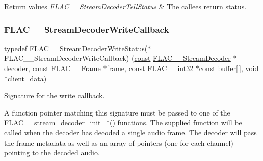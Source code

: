 \begin{DoxyRetVals}{Return values}
{\em F\+L\+A\+C\+\_\+\+\_\+\+Stream\+Decoder\+Tell\+Status} & The callee\textquotesingle{}s return status. \\
\hline
\end{DoxyRetVals}
\mbox{\label{group__flac__stream__decoder_ga61e48dc2c0d2f6c5519290ff046874a4}} 
\subsubsection{\texorpdfstring{F\+L\+A\+C\+\_\+\+\_\+\+Stream\+Decoder\+Write\+Callback}{FLAC\_\_StreamDecoderWriteCallback}}
{\footnotesize\ttfamily typedef \hyperlink{group__flac__stream__decoder_ga73f67eb9e0ab57945afe038751bc62c8}{F\+L\+A\+C\+\_\+\+\_\+\+Stream\+Decoder\+Write\+Status}($\ast$ F\+L\+A\+C\+\_\+\+\_\+\+Stream\+Decoder\+Write\+Callback) (\hyperlink{zconf_8h_a2c212835823e3c54a8ab6d95c652660e}{const} \hyperlink{struct_f_l_a_c_____stream_decoder}{F\+L\+A\+C\+\_\+\+\_\+\+Stream\+Decoder} $\ast$decoder, \hyperlink{zconf_8h_a2c212835823e3c54a8ab6d95c652660e}{const} \hyperlink{struct_f_l_a_c_____frame}{F\+L\+A\+C\+\_\+\+\_\+\+Frame} $\ast$frame, \hyperlink{zconf_8h_a2c212835823e3c54a8ab6d95c652660e}{const} \hyperlink{ordinals_8h_a33fd77bfe6d685541a0c034a75deccdc}{F\+L\+A\+C\+\_\+\+\_\+int32} $\ast$\hyperlink{zconf_8h_a2c212835823e3c54a8ab6d95c652660e}{const} buffer\mbox{[}$\,$\mbox{]}, \hyperlink{png_8h_ac9c84fa68bbad002983e35ce3663c686}{void} $\ast$client\+\_\+data)}

Signature for the write callback.

A function pointer matching this signature must be passed to one of the F\+L\+A\+C\+\_\+\+\_\+stream\+\_\+decoder\+\_\+init\+\_\+$\ast$() functions. The supplied function will be called when the decoder has decoded a single audio frame. The decoder will pass the frame metadata as well as an array of pointers (one for each channel) pointing to the decoded audio.

